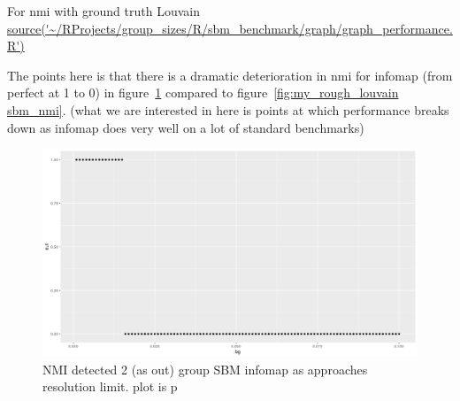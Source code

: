 For nmi with ground truth Louvain
\url{source('~/RProjects/group_sizes/R/sbm_benchmark/graph/graph_performance.R')}

The points here is that there is a dramatic deterioration in nmi for infomap (from perfect at 1 to 0) in figure~\ref{fig:my_rough_infomap} compared to figure~\ref{fig:my_rough_louvain sbm_nmi}. (what we are interested in here is points at which performance breaks down as infomap does very well on a lot of standard benchmarks)


\begin{figure}
    \centering
    \includegraphics[width=\textwidth]{images/Rplot_rough_infomap_nmi_sbm.png}
    \caption{NMI detected 2 (as out) group SBM infomap as approaches resolution limit. plot is p}
    \label{fig:my_rough_infomap}
\end{figure}

